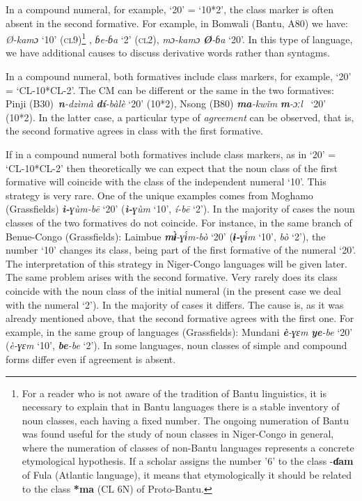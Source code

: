 In a compound numeral, for example, ‘20’ = ‘10*2’, the class marker is often absent in the second formative. For example, in Bomwali (Bantu, A80) we have: \textit{Ø-kamɔ} ‘10’ (\textsc{cl}9)\footnote{For a reader who is not aware of the tradition of Bantu linguistics, it is necessary to explain that in Bantu languages there is a stable inventory of noun classes, each having a fixed number. The ongoing numeration of Bantu was found useful for the study of noun classes in Niger-Congo in general, where the numeration of classes of non-Bantu languages represents a concrete etymological hypothesis. If a scholar assigns the number '6' to the class -\textbf{ɗam} of Fula (Atlantic language), it means that etymologically it should be related to the class \textbf{*ma} (CL 6N) of Proto-Bantu.} ,  \textit{ɓe-ɓa}  ‘2’ (\textsc{cl}2),  \textit{mɔ-kamɔ} \textbf{\textit{Ø}}\textit{-ɓa} ‘20’. In this type of language, we have additional causes to discuss derivative words rather than syntagms. 

In a compound numeral, both formatives include class markers, for example, ‘20’ = ‘CL-10*CL-2’. The CM can be different or the same in the two formatives: Pinji (B30)~\textbf{\textit{n}}\textit{-dzìm{\`{a}}} \textbf{\textit{d{\'{i}}}}\textit{-b{\`{a}}l{\`{e}}} ‘20’ (10*2), Nsong (B80) \textbf{\textit{ma}}\textit{-kw{\v{i}}m} \textbf{\textit{m}}\textit{-ɔːl}~ ‘20’ (10*2). In the latter case, a particular type of \textit{agreement} can be observed, that is, the second formative agrees in class with the first formative. 

If in a compound numeral both formatives include class markers, as in ‘20’ = ‘CL-10*CL-2’ then theoretically we can expect that the noun class of the first formative will coincide with the class of the independent numeral `10'. This strategy is very rare. One of the unique examples comes from Moghamo (Grassfields) \textbf{\textit{ì-}}\textit{ɣ{\`{u}}m-b{\={e}}} ‘20’ (\textbf{\textit{ì-}}\textit{ɣ{\`{u}}m} ‘10’,  \textit{{\'{i}}-b{\={e}}}  ‘2’).  In the majority of cases the noun classes of the two formatives do not coincide. For instance, in the same branch of Benue-Congo (Grassfields): Laimbue \textbf{\textit{m{\`{ɨ}}}}\textit{-ɣ{\'{ɨ}}m-b{\`{o}}} ‘20’ (\textbf{\textit{ɨ-}}\textit{ɣ{\'{ɨ}}m} ‘10', \textit{b{\`{o}}} ‘2’), the number `10' changes its class, being part of the first formative of the numeral `20'. The interpretation of this strategy in Niger-Congo languages will be given later. The same problem arises with the second formative. Very rarely does its class coincide with the noun class of the initial numeral (in the present case we deal with the numeral `2'). In the majority of cases it differs. The cause is, as it was already mentioned above, that the second formative agrees with the first one. For example, in the same group of languages (Grassfields): Mundani \textbf{\textit{{\`{e}}}}\textit{-ɣɛm} \textbf{\textit{ye}}\textit{-be} ‘20’  (\textit{{\`{e}}-ɣɛm} ‘10’, \textbf{\textit{be}}\textit{-be} ‘2’). In some languages, noun classes of simple and compound forms differ even if agreement is absent. 

